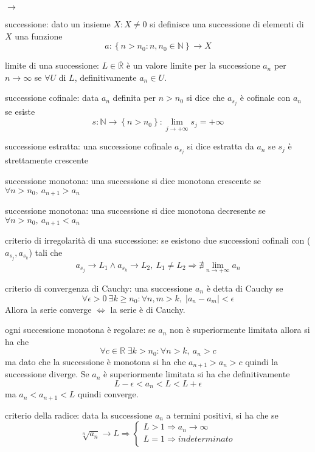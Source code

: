 \documentclass[12pt,a4paper]{article}
\newcommand*{\ep}{\epsilon}
\begin{document}
\begin{list}{$\rightarrow$}{}
    \item successione: dato un insieme $X: X \neq 0$ si definisce una successione di elementi di $X$ una funzione \[a: \left\{n > n_0: n, n_0 \in \mathbb{N}\right\} \rightarrow X\]
    \item limite di una successione: $L \in \overline{\mathbb{R}}$ è un valore limite per la successione $a_n$ per $n \to \infty$ se $\forall U$ di $L$, definitivamente $a_n \in U$. 
    \item successione cofinale: data $a_n$ definita per $n > n_0$ si dice che $a_{s_j}$ è cofinale con $a_n$ se esiste \[s: \mathbb{N} \rightarrow \left\{n > n_0\right\} : \lim_{j \to +\infty} s_j = +\infty\]
    \item successione estratta: una successione cofinale $a_{s_j}$ si dice estratta da $a_n$ se $s_j$ è strettamente crescente
    \item successione monotona: una successione si dice monotona crescente se $\forall n > n_0, \: a_{n + 1} > a_n$
    \item successione monotona: una successione si dice monotona decresente se $\forall n > n_0, \: a_{n + 1} < a_n$
    \item criterio di irregolarità di una successione: se esistono due successioni cofinali con ($a_{s_j}, a_{s_k}$) tali che \[a_{s_j} \to L_1 \wedge  a_{s_k} \to L_2, \: L_1 \neq L_2 \Rightarrow \nexists \lim_{n\to +\infty}a_n\] 
    \item criterio di convergenza di Cauchy: una successione $a_n$ è detta di Cauchy se \[\forall \ep > 0 \: \exists k \ge n_0 : \forall n, m > k, \;\left\lvert a_n - a_m\right\rvert < \ep  \] Allora la serie converge $\Leftrightarrow $ la serie è di Cauchy.
    \item ogni successione monotona è regolare: se $a_n$ non è superiormente limitata allora si ha che \[\forall c \in \mathbb{R} \; \exists k > n_0 : \forall n > k, \: a_n > c\] ma dato che la successione è monotona si ha che $a_{n + 1} > a_n > c$ quindi la successione diverge. Se $a_n$ è superiormente limitata si ha che definitivamente \[L - \ep < a_n < L < L +\ep\] ma $a_n < a_{n + 1} < L$ quindi converge.
    \item criterio della radice: data la successione $a_n$ a termini positivi, si ha che se \[ \sqrt[n]{a_n} \to L \Rightarrow 
    \begin{cases}
    L > 1 \Rightarrow a_n \to \infty\\
    L = 1 \Rightarrow indeterminato\\

\end{cases}\]
\end{list}
\end{document}
